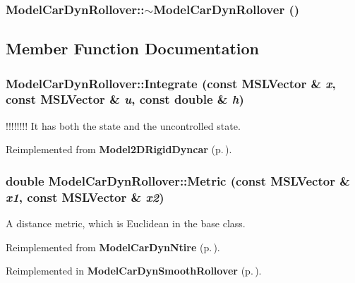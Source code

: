 \subsubsection{\setlength{\rightskip}{0pt plus 5cm}Model\-Car\-Dyn\-Rollover::$\sim$Model\-Car\-Dyn\-Rollover ()\hspace{0.3cm}{\tt  [inline, virtual]}}\label{classModelCarDynRollover_a1}




\subsection{Member Function Documentation}
\subsubsection{ Model\-Car\-Dyn\-Rollover::Integrate (const {\bf MSLVector} \& {\em x}, const {\bf MSLVector} \& {\em u}, const double \& {\em h})\hspace{0.3cm}{\tt  [virtual]}}\label{classModelCarDynRollover_a5}


!!!!!!!! It has both the state and the uncontrolled state.



Reimplemented from {\bf Model2DRigid\-Dyncar} {\rm (p.\,\pageref{classModel2DRigidDyncar_a2})}.
\subsubsection{\setlength{\rightskip}{0pt plus 5cm}double Model\-Car\-Dyn\-Rollover::Metric (const {\bf MSLVector} \& {\em x1}, const {\bf MSLVector} \& {\em x2})\hspace{0.3cm}{\tt  [virtual]}}\label{classModelCarDynRollover_a6}


A distance metric, which is Euclidean in the base class.



Reimplemented from {\bf Model\-Car\-Dyn\-Ntire} {\rm (p.\,\pageref{classModelCarDynNtire_a3})}.

Reimplemented in {\bf Model\-Car\-Dyn\-Smooth\-Rollover} {\rm (p.\,\pageref{classModelCarDynSmoothRollover_a4})}.
